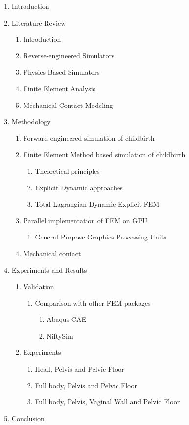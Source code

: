 \label{proposedstructure}

\begin{enumerate}
\item Introduction
\item Literature Review
  \begin{enumerate}
  \item Introduction
  \item Reverse-engineered Simulators
  \item Physics Based Simulators
  \item Finite Element Analysis
  \item Mechanical Contact Modeling
  \end{enumerate}
\item Methodology
  \begin{enumerate}
    \item Forward-engineered simulation of childbirth
    \item Finite Element Method based simulation of childbirth
    \begin{enumerate}
      \item Theoretical principles
      \item Explicit Dynamic approaches
      \item Total Lagrangian Dynamic Explicit FEM
    \end{enumerate}
    \item Parallel implementation of FEM on GPU
    \begin{enumerate}
      \item General Purpose Graphics Processing Units
    \end{enumerate}
    \item Mechanical contact
  \end{enumerate}
\item Experiments and Results
  \begin{enumerate}
    \item Validation
    \begin{enumerate}
      \item Comparison with other FEM packages
      \begin{enumerate}
        \item Abaqus CAE
        \item NiftySim
      \end{enumerate}
    \end{enumerate}
    \item Experiments
    \begin{enumerate}
      \item Head, Pelvis and Pelvic Floor
      \item Full body, Pelvis and Pelvic Floor
      \item Full body, Pelvis, Vaginal Wall and Pelvic Floor
    \end{enumerate}
  \end{enumerate}
\item Conclusion
\end{enumerate}
